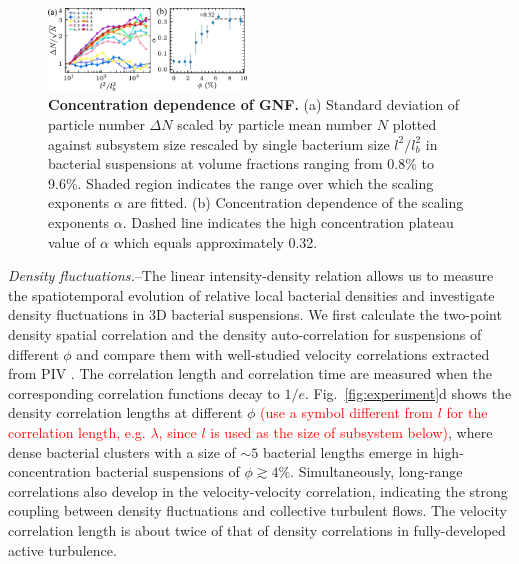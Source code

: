 \documentclass[twocolumn,aps,prl,amsmath,amssymb,longbibliography]{revtex4-2}
\begin{document}
\begin{figure}[ht]
\begin{center}
\includegraphics[width=0.47\textwidth]{figures/GNF/v1.pdf}
\caption[Concentration dependence of GNF.]
{
\textbf{Concentration dependence of GNF.}
(a) Standard deviation of particle number $\Delta N$ scaled by particle mean number $N$ plotted against subsystem size rescaled by single bacterium size $l^2/l_b^2$ in bacterial suspensions at volume fractions ranging from 0.8\% to 9.6\%. Shaded region indicates the range over which the scaling exponents $\alpha$ are fitted.
(b) Concentration dependence of the scaling exponents $\alpha$. Dashed line indicates the high concentration plateau value of $\alpha$ which equals approximately 0.32.
}
\label{fig:GNF}
\end{center}
\end{figure}


\textit{Density fluctuations.}--The linear intensity-density relation allows us to measure the spatiotemporal evolution of relative local bacterial densities and investigate density fluctuations in 3D bacterial suspensions. We first calculate the two-point density spatial correlation and the density auto-correlation for suspensions of different $\phi$ and compare them with well-studied velocity correlations extracted from PIV \cite{Liu2020}.
The correlation length and correlation time are measured when the corresponding correlation functions decay to $1/e$. Fig.~\ref{fig:experiment}d shows the density correlation lengths at different $\phi$ \textcolor{red}{(use a symbol different from $l$ for the correlation length, e.g. $\lambda$, since $l$ is used as the size of subsystem below)}, where dense bacterial clusters with a size of $\sim 5$ bacterial lengths emerge in high-concentration bacterial suspensions of $\phi \gtrsim 4\%$.
Simultaneously, long-range correlations also develop in the velocity-velocity correlation, indicating the strong coupling between density fluctuations and collective turbulent flows. The velocity correlation length is about twice of that of density correlations in fully-developed active turbulence.
\end{document}
